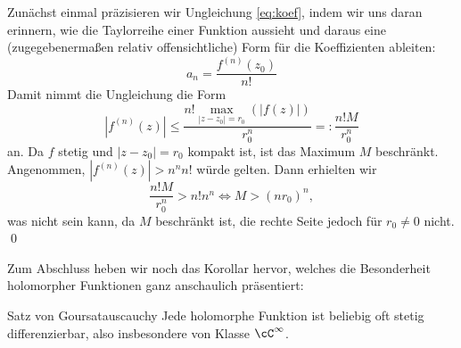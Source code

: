 \begin{lösung}
Zunächst einmal präzisieren wir Ungleichung \ref{eq:koef}, indem wir uns daran erinnern, wie die Taylorreihe einer Funktion aussieht und daraus eine (zugegebenermaßen relativ offensichtliche) Form für die Koeffizienten ableiten:
\begin{equation}
a_n = \frac{f^{(n)}(z_0)}{n!}
\end{equation}
Damit nimmt die Ungleichung die Form
\begin{equation}
|f^{(n)}(z)| \leq \frac{n! \max_{|z-z_0|=r_0}(|f(z)|)}{r_0^n} =:\frac{n!M}{r_0^n}
\end{equation}
an. Da $f$ stetig und $|z-z_0|=r_0$ kompakt ist, ist das Maximum $M$ beschränkt. Angenommen, $|f^{(n)}(z)| > n^n n!$ würde gelten. Dann erhielten wir
\begin{equation}
\frac{n!M}{r_0^n} > n! n^n \iff M > (nr_0)^n,
\end{equation}
was nicht sein kann, da $M$ beschränkt ist, die rechte Seite jedoch für $r_0 \neq 0$ nicht. \qed
\end{lösung}
Zum Abschluss heben wir noch das Korollar hervor, welches die Besonderheit holomorpher Funktionen ganz anschaulich präsentiert:
\begin{satz}{Satz von Goursat}{auscauchy}
Jede holomorphe Funktion ist beliebig oft stetig differenzierbar, also insbesondere von Klasse $\cC^\infty$.
\end{satz}